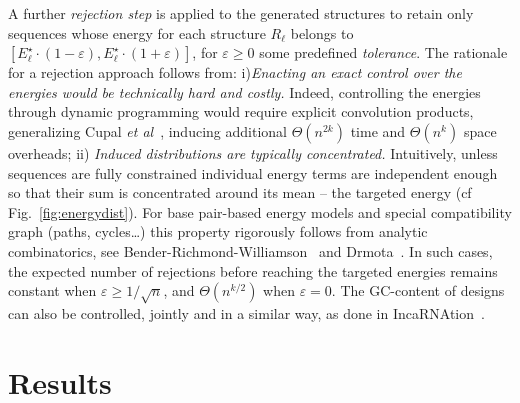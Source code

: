 \documentclass{bioinfo}
\newcommand{\Def}[1]{{\it #1}}
\newcommand{\TargetE}{E^{\star}}
\newcommand{\Nuc}[1]{{\sf #1}}
\newcommand{\Cb}{\Nuc{C}}
\newcommand{\Gb}{\Nuc{G}}
\newcommand{\GCb}{\Gb\Cb}
\newcommand{\Software}[1]{{\ttfamily #1}}
\begin{document}
A further \Def{rejection step} is applied to the generated structures to retain only sequences whose energy for each structure $R_\ell$ belongs to $[\TargetE_\ell\cdot(1-\varepsilon),\TargetE_\ell\cdot(1+\varepsilon)]$, for $\varepsilon\ge 0$ some predefined \Def{tolerance}. The rationale for a rejection approach follows from: 
i)\emph{Enacting an exact control over the energies would  be technically hard and costly.} Indeed, controlling the energies through dynamic programming would require explicit convolution products, generalizing Cupal \emph{et al}~\cite{Cupal1996}, inducing additional $\Theta(n^{2k})$ time and $\Theta(n^k)$ space overheads;
ii) \emph{Induced distributions are typically concentrated.} Intuitively, unless sequences are fully constrained individual energy terms are independent enough so that their sum is concentrated around its mean -- the targeted energy (cf Fig.~\ref{fig:energydist}). 
For base pair-based energy models and special compatibility graph
(paths, cycles\ldots) this property rigorously follows from analytic
combinatorics, see Bender-Richmond-Williamson~\cite{Bender1983} and
Drmota~\cite{Drmota1997}. In such cases, the expected number of
rejections before reaching the targeted energies remains constant when
$\varepsilon\ge 1/\sqrt{n}$, and $\Theta(n^{k/2})$ when
$\varepsilon=0$. The \GCb-content of designs can also be controlled,
jointly and in a similar way, as done in
\Software{IncaRNAtion}~\cite{Reinharz2013}.


\section{Results}\label{sec:results}
\end{document}
